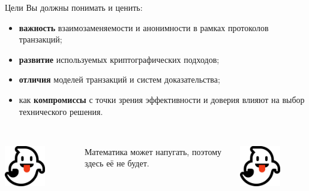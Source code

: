 \documentclass[aspectratio=169]{beamer}
\begin{document}
\begin{frame}{Цели}
Вы должны понимать и ценить:
\begin{itemize}
\item \textbf{важность} взаимозаменяемости и анонимности в рамках протоколов транзакций;
\item \textbf{развитие} используемых криптографических подходов;
\item \textbf{отличия} моделей транзакций и систем доказательства;
\item как \textbf{компромиссы} с точки зрения эффективности и доверия влияют на выбор технического решения. \\~\\
\end{itemize}

\begin{columns}
\begin{column}{0.2\textwidth}
\centering
\includegraphics[width=0.6\textwidth]{icon-ghost.png}
\end{column}
\begin{column}{0.6\textwidth}
\centering
Математика может напугать, поэтому здесь её не будет.
\end{column}
\begin{column}{0.2\textwidth}
\centering
\includegraphics[width=0.6\textwidth]{icon-ghost.png}
\end{column}
\end{columns}
\end{frame}
\end{document}
